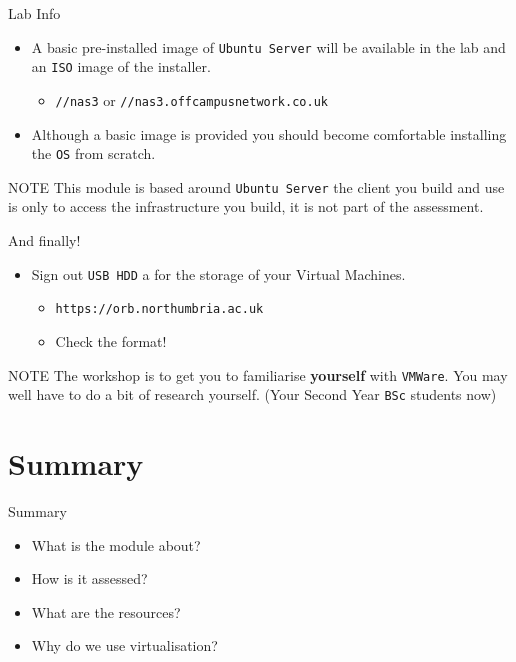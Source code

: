 \documentclass{beamer}
\begin{document}
\begin{frame}{Lab Info}
  \begin{itemize}
    \item A basic pre-installed image of \texttt{Ubuntu Server} will be available in the lab and an \texttt{ISO} image of the installer. 
      \begin{itemize}
        \item \texttt{//nas3} or \texttt{//nas3.offcampusnetwork.co.uk} 
      \end{itemize}
    \item Although a basic image is provided you should become comfortable installing the \texttt{OS} from scratch.
  \end{itemize}
  \begin{block}{NOTE}
    This module is based around \texttt{Ubuntu Server} the client you build and use is only to access the infrastructure you build, it is not part of the assessment.
  \end{block}
\end{frame}

\begin{frame}{And finally!}
  \begin{itemize}
    \item Sign out \texttt{USB HDD} a for the storage of your Virtual Machines.
      \begin{itemize}
        \item \texttt{https://orb.northumbria.ac.uk} 
        \item Check the format!
      \end{itemize}
  \end{itemize}
  \begin{block}{NOTE}
    The workshop is to get you to familiarise \textbf{yourself} with \texttt{VMWare}. You may well have to do a bit of research yourself. (Your Second Year \texttt{BSc} students now)
  \end{block}
\end{frame}



\section*{Summary}

\begin{frame}{Summary}
  \begin{itemize}
    \item What is the module about?
    \item How is it assessed?
    \item What are the resources?
    \item Why do we use virtualisation?
  \end{itemize}
\end{frame}
\end{document}
